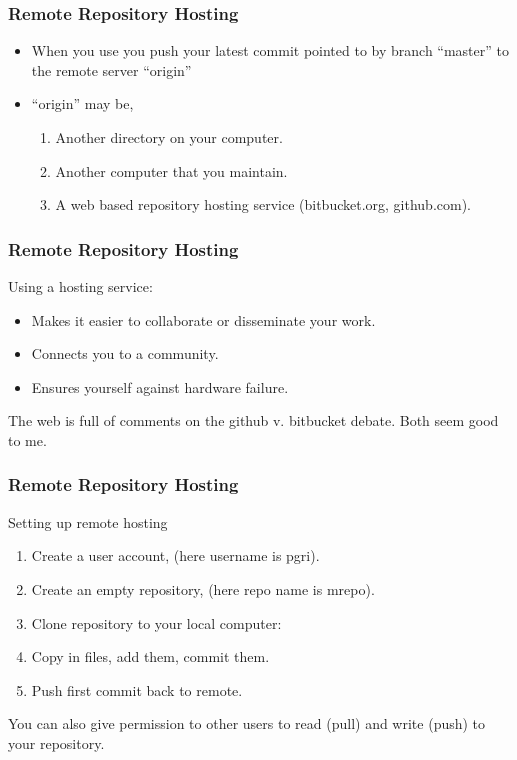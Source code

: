 \begin{frame}[fragile]\frametitle{Remote Repository Hosting}
\begin{itemize}
  \item   When you use  you push your latest commit pointed to by branch ``master'' to the remote server ``origin''
  \item ``origin'' may be, 
  \begin{enumerate}
     \item Another directory on your computer. 
     \item Another computer that you maintain. 
     \item A web based repository hosting service (bitbucket.org, github.com).
  \end{enumerate}
\end{itemize}
\end{frame}

\begin{frame}[fragile]\frametitle{Remote Repository Hosting}
Using a hosting service:
\begin{itemize}
\item Makes it easier to collaborate or disseminate your work.
\item Connects you to a community.  
\item Ensures yourself against hardware failure. 
\end{itemize}
The web is full of comments on the github v. bitbucket debate. Both seem good to me.
\end{frame}

\begin{frame}[fragile]\frametitle{Remote Repository Hosting}
Setting up remote hosting
\begin{enumerate}
\item Create a user account, (here username is pgri). 
\item Create an empty repository, (here repo name is mrepo).  
\item Clone repository to your local computer:   
\item Copy in files, add them, commit them. 
\item Push first commit back to remote. 
\end{enumerate}
You can also give permission to other users to read (pull) and write (push) to your repository.
\end{frame}


